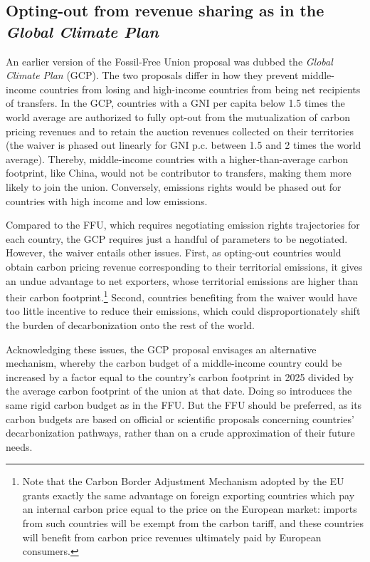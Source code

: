 \documentclass[12pt,english]{article}
\begin{document}
\subsection{Opting-out from revenue sharing as in the \textit{Global Climate Plan}}\label{subsec:gcp}

An earlier version of the Fossil-Free Union proposal was dubbed the \textit{Global Climate Plan} (GCP).\cite{fabre_global_2023,fabre_global_2024} The two proposals differ in how they prevent middle-income countries from losing %
and high-income countries from being net recipients of transfers. In the GCP, countries with a GNI per capita below 1.5 times the world average are authorized to fully opt-out from the mutualization of carbon pricing revenues and to retain the auction revenues collected on their territories (the waiver is phased out linearly for GNI p.c. between 1.5 and 2 times the world average). Thereby, middle-income countries with a higher-than-average carbon footprint, like China, would not be contributor to transfers, making them more likely to join the union. Conversely, emissions rights would be phased out for countries with high income and low emissions. 

Compared to the FFU, which requires negotiating emission rights trajectories for each country, the GCP requires just a handful of parameters to be negotiated. However, the waiver entails other issues. First, as opting-out countries would obtain carbon pricing revenue corresponding to their territorial emissions, it gives an undue advantage to net exporters, whose territorial emissions are higher than their carbon footprint.\footnote{Note that the Carbon Border Adjustment Mechanism adopted by the EU grants exactly the same advantage on foreign exporting
countries which pay an internal carbon price equal to the price on the European market: imports from such countries will be exempt from the carbon tariff, and these countries will benefit from carbon price revenues ultimately paid by European consumers.} Second, countries benefiting from the waiver would have too little incentive to reduce their emissions, which could disproportionately shift the burden of decarbonization onto the rest of the world. 

Acknowledging these issues, the GCP proposal envisages an alternative mechanism,\cite{fabre_global_2024} whereby the carbon budget of a middle-income country could be increased by a factor equal to the country's carbon footprint in 2025 divided by the average carbon footprint of the union at that date. Doing so introduces the same rigid carbon budget as in the FFU. But the FFU should be preferred, as its carbon budgets are based on official or scientific proposals concerning countries' decarbonization pathways, rather than on a crude approximation of their future needs.
\end{document}
